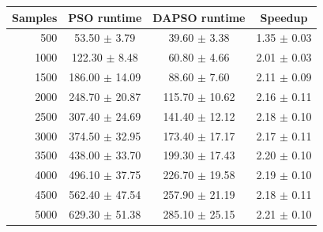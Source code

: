 \begin{tabular}{rccc}
\hline
Samples & PSO runtime & DAPSO runtime & Speedup \\
\hline
500 & 53.50 $\pm$ 3.79 & 39.60 $\pm$ 3.38 & 1.35 $\pm$ 0.03 \\
1000 & 122.30 $\pm$ 8.48 & 60.80 $\pm$ 4.66 & 2.01 $\pm$ 0.03 \\
1500 & 186.00 $\pm$ 14.09 & 88.60 $\pm$ 7.60 & 2.11 $\pm$ 0.09 \\
2000 & 248.70 $\pm$ 20.87 & 115.70 $\pm$ 10.62 & 2.16 $\pm$ 0.11 \\
2500 & 307.40 $\pm$ 24.69 & 141.40 $\pm$ 12.12 & 2.18 $\pm$ 0.10 \\
3000 & 374.50 $\pm$ 32.95 & 173.40 $\pm$ 17.17 & 2.17 $\pm$ 0.11 \\
3500 & 438.00 $\pm$ 33.70 & 199.30 $\pm$ 17.43 & 2.20 $\pm$ 0.10 \\
4000 & 496.10 $\pm$ 37.75 & 226.70 $\pm$ 19.58 & 2.19 $\pm$ 0.10 \\
4500 & 562.40 $\pm$ 47.54 & 257.90 $\pm$ 21.19 & 2.18 $\pm$ 0.11 \\
5000 & 629.30 $\pm$ 51.38 & 285.10 $\pm$ 25.15 & 2.21 $\pm$ 0.10 \\
\hline
\end{tabular}